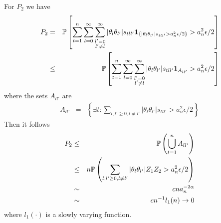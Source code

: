 \documentclass{article}
\begin{document}
For $P_2$ we have
\begin{eqnarray*}
  P_2 &=& \mathbb{P}\left[
    \sum_{t=1}^n \sum_{l=0}^\infty \sum_{\substack{l'=0 \\l'\neq
        l}}^\infty |\theta_l \theta_{l'}|s_{tll'} \mathbf{1}_{\{|\theta_l
      \theta_{l'}|s_{tll'} > a_n^2 \epsilon/2\}} > a_n^2
    \epsilon/2\right] \\
  &\leq& \mathbb{P}\left[
    \sum_{t=1}^n \sum_{l=0}^\infty \sum_{\substack{l'=0 \\l'\neq
        l}}^\infty |\theta_l \theta_{l'}|s_{tll'} \mathbf{1}_{A_{ll'}}
    > a_n^2 \epsilon/2\right]
\end{eqnarray*}
where the sets $A_{ll'}$ are
\begin{eqnarray*}
  A_{ll'} &=& \left\{
    \exists t:\sum_{l,l' \geq 0, l\neq l'}|\theta_l
    \theta_{l'}|s_{tll'} > a_n^2 \epsilon/2\right\}
\end{eqnarray*}
Then it follows
\begin{eqnarray*}
  P_2 &\leq& \mathbb{P}\left(
    \bigcup_{t=1}^{n} A_{ll'}
  \right) \\
  &\leq& n\mathbb{P}\left(\sum_{l,l' \geq 0, l\neq l'}|\theta_l
    \theta_{l'}|Z_1Z_{2} > a_n^2 \epsilon/2\right) \\
  &\sim& c n a_n^{-2\alpha} \\
  &\sim& c n^{-1} l_1(n)\to 0
\end{eqnarray*}
where $l_1(\cdot)$ is a slowly varying function.


\end{document}
